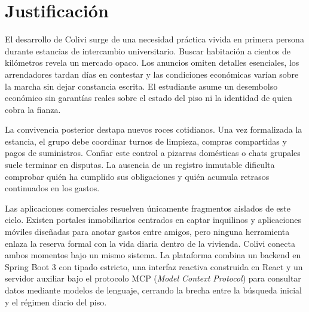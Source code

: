 \section{Justificación}
\label{sec:justificacion}

    El desarrollo de Colivi surge de una necesidad práctica vivida en primera persona durante estancias de intercambio universitario. Buscar habitación a cientos de kilómetros revela un mercado opaco. Los anuncios omiten detalles esenciales, los arrendadores tardan días en contestar y las condiciones económicas varían sobre la marcha sin dejar constancia escrita. El estudiante asume un desembolso económico sin garantías reales sobre el estado del piso ni la identidad de quien cobra la fianza.

    La convivencia posterior destapa nuevos roces cotidianos. Una vez formalizada la estancia, el grupo debe coordinar turnos de limpieza, compras compartidas y pagos de suministros. Confiar este control a pizarras domésticas o chats grupales suele terminar en disputas. La ausencia de un registro inmutable dificulta comprobar quién ha cumplido sus obligaciones y quién acumula retrasos continuados en los gastos.

    Las aplicaciones comerciales resuelven únicamente fragmentos aislados de este ciclo. Existen portales inmobiliarios centrados en captar inquilinos y aplicaciones móviles diseñadas para anotar gastos entre amigos, pero ninguna herramienta enlaza la reserva formal con la vida diaria dentro de la vivienda. Colivi conecta ambos momentos bajo un mismo sistema. La plataforma combina un backend en Spring Boot 3 con tipado estricto, una interfaz reactiva construida en React y un servidor auxiliar bajo el protocolo MCP (\emph{Model Context Protocol}) para consultar datos mediante modelos de lenguaje, cerrando la brecha entre la búsqueda inicial y el régimen diario del piso.
